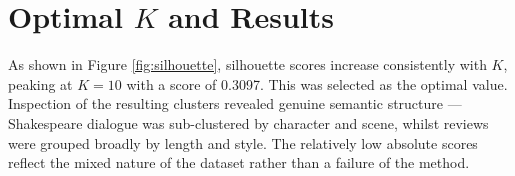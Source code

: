 \documentclass[11pt]{article}
\begin{document}
\section{Optimal $K$ and Results}

As shown in Figure \ref{fig:silhouette}, silhouette scores increase consistently with $K$, peaking at $K=10$ with a score of 0.3097. This was selected as the optimal value. Inspection of the resulting clusters revealed genuine semantic structure --- Shakespeare dialogue was sub-clustered by character and scene, whilst reviews were grouped broadly by length and style. The relatively low absolute scores reflect the mixed nature of the dataset rather than a failure of the method.





\end{document}
